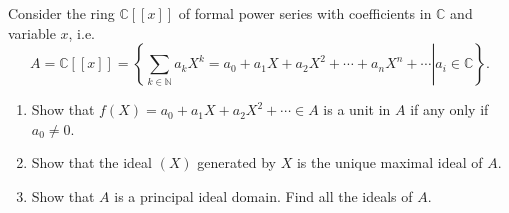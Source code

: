 \documentclass{article}
\newcounter{Problem}
\newenvironment{Problem}{\begin{Exercise}[name={Problem},
                                          counter={Problem}]}
                        {\end{Exercise}}
\begin{document}
\begin{Problem}
  Consider the ring $\mathbb{C}[[x]]$ of formal power series with
  coefficients in $\mathbb{C}$ and variable $x$, i.e.
  $$
  A = \mathbb{C}[[x]] =
  \left\{
    \left.
      \sum_{k \in \mathbb{N}} a_k X^k
    = a_0 + a_1 X + a_2 X^2 + \cdots + a_n X^n + \cdots
    \right|
      a_i \in \mathbb{C}
  \right\}.
  $$
  \begin{enumerate}
    \item{
      Show that $f(X) = a_0 + a_1 X + a_2 X^2 + \cdots \in A$ is a
      unit in $A$ if any only if $a_0 \neq 0$.
    }
    \item{
      Show that the ideal $(X)$ generated by $X$ is the unique maximal
      ideal of $A$.
    }
    \item{
      Show that $A$ is a principal ideal domain. Find all the ideals
      of $A$.
    }
  \end{enumerate}
\end{Problem}
\end{document}
